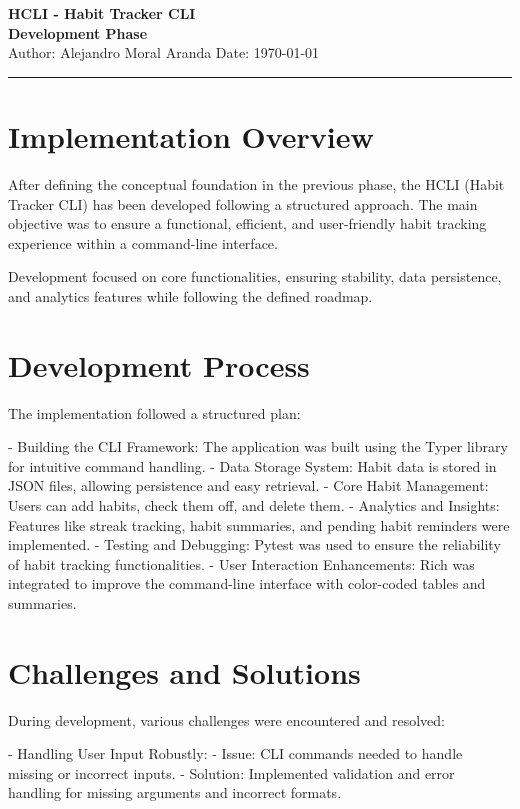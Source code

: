 \documentclass[a4paper,12pt]{article}
\begin{document}
\begin{center}
    {\LARGE \textbf{HCLI - Habit Tracker CLI}}\\[0.5cm]
    {\Large \textbf{Development Phase}}\\[0.3cm]
    {\small Author: Alejandro Moral Aranda \hspace{1cm} Date: \today}
    \hrule
\end{center}

\section{Implementation Overview}
After defining the conceptual foundation in the previous phase, the HCLI (Habit Tracker CLI) has been developed following a structured approach. The main objective was to ensure a functional, efficient, and user-friendly habit tracking experience within a command-line interface.

Development focused on core functionalities, ensuring stability, data persistence, and analytics features while following the defined roadmap.

\section{Development Process}
The implementation followed a structured plan:

- Building the CLI Framework: The application was built using the Typer library for intuitive command handling.
- Data Storage System: Habit data is stored in JSON files, allowing persistence and easy retrieval.
- Core Habit Management: Users can add habits, check them off, and delete them.
- Analytics and Insights: Features like streak tracking, habit summaries, and pending habit reminders were implemented.
- Testing and Debugging: Pytest was used to ensure the reliability of habit tracking functionalities.
- User Interaction Enhancements: Rich was integrated to improve the command-line interface with color-coded tables and summaries.

\section{Challenges and Solutions}
During development, various challenges were encountered and resolved:

- Handling User Input Robustly:  
  - Issue: CLI commands needed to handle missing or incorrect inputs.  
  - Solution: Implemented validation and error handling for missing arguments and incorrect formats.
\end{document}
